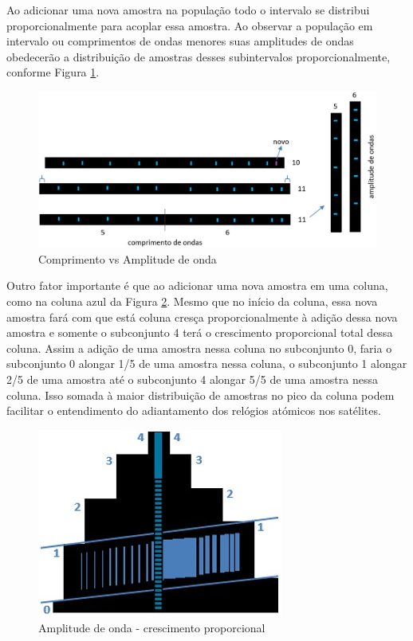 Ao adicionar uma nova amostra na população todo o intervalo se distribui proporcionalmente para acoplar essa amostra. Ao observar a população em intervalo ou comprimentos de ondas menores suas amplitudes de ondas obedecerão a distribuição de amostras desses subintervalos proporcionalmente, conforme Figura \ref{fig:consciousness_space_volume_amplitude}.
	\begin{figure}[H]
	\caption{Comprimento vs Amplitude de onda}
	\label{fig:consciousness_space_volume_amplitude}
	\centering
	\includegraphics[scale=.4]{sections/images/consciousness_space_volume_amplitude.jpg}
	\end{figure}

Outro fator importante é que ao adicionar uma nova amostra em uma coluna, como na coluna azul da Figura \ref{fig:consciousness_space_amplitude_growth}. Mesmo que no início da coluna, essa nova amostra fará com que está coluna cresça proporcionalmente à adição dessa nova amostra e somente o subconjunto 4 terá o crescimento proporcional total dessa coluna. Assim a adição de uma amostra nessa coluna no subconjunto 0, faria o subconjunto 0 alongar 1/5 de uma amostra nessa coluna, o subconjunto 1 alongar 2/5 de uma amostra até o subconjunto 4 alongar 5/5 de uma amostra nessa coluna. Isso somada à maior distribuição de amostras no pico da coluna podem facilitar o entendimento do adiantamento dos relógios atómicos nos satélites.
	\begin{figure}[H]
	\caption{Amplitude de onda - crescimento proporcional}
	\label{fig:consciousness_space_amplitude_growth}
	\centering
	\includegraphics[scale=.7]{sections/images/consciousness_space_amplitude_growth.jpg}
	\end{figure}

